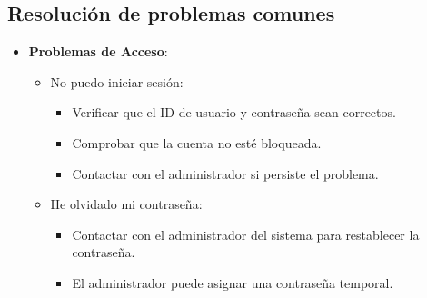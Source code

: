 \subsection{Resolución de problemas comunes}

\begin{itemize}
   \item \textbf{Problemas de Acceso}:
   \begin{itemize}
      \item No puedo iniciar sesión:
      \begin{itemize}
         \item Verificar que el ID de usuario y contraseña sean correctos.
         \item Comprobar que la cuenta no esté bloqueada.
         \item Contactar con el administrador si persiste el problema.
      \end{itemize}
      \item He olvidado mi contraseña:
      \begin{itemize}
         \item Contactar con el administrador del sistema para restablecer la contraseña.
         \item El administrador puede asignar una contraseña temporal.
      \end{itemize}
   \end{itemize}


\end{itemize}
